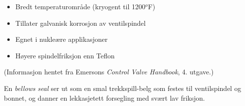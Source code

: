 \begin{itemize}
\item{} Bredt temperaturområde (kryogent til 1200$^{o}$F)
\item{} Tillater galvanisk korrosjon av ventilspindel
\item{} Egnet i nukleære applikasjoner
\item{} Høyere spindelfriksjon enn Teflon
\end{itemize}

\vskip 10pt

(Informasjon hentet fra Emersons {\it Control Valve Handbook}, 4. utgave.)

\vskip 10pt

En {\it bellows seal} ser ut som en smal trekkspill-belg som festes til ventilspindel og bonnet, og danner en lekkasjetett forsegling med svært lav friksjon.


